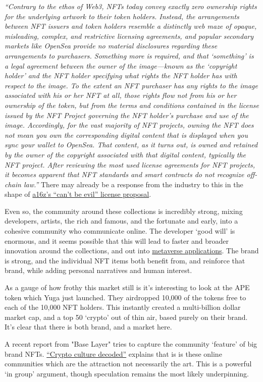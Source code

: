 \textit{``Contrary to the ethos of Web3, NFTs today convey exactly zero ownership rights for the underlying artwork to their token holders. Instead, the arrangements between NFT issuers and token holders resemble a distinctly web maze of opaque, misleading, complex, and restrictive licensing agreements, and popular secondary markets like OpenSea provide no material disclosures regarding these arrangements to purchasers. Something more is required, and that `something' is a legal agreement between the owner of the image—known as the `copyright holder' and the NFT holder specifying what rights the NFT holder has with respect to the image. To the extent an NFT purchaser has any rights to the image associated with his or her NFT at all, those rights flow not from his or her ownership of the token, but from the terms and conditions contained in the license issued by the NFT Project governing the NFT holder’s purchase and use of the image. Accordingly, for the vast majority of NFT projects, owning the NFT does not mean you own the corresponding digital content that is displayed when you sync your wallet to OpenSea. That content, as it turns out, is owned and retained by the owner of the copyright associated with that digital content, typically the NFT project.
After reviewing the most used license agreements for NFT projects, it becomes apparent that NFT standards and smart contracts do not recognize off-chain law.''} There may already be a response from the industry to this in the shape of \href{https://a16zcrypto.com/introducing-nft-licenses/}{a16z's ``can't be evil'' license proposal}.\par
Even so, the community around these collections is incredibly strong, mixing developers, artists, the rich and famous, and the fortunate and early, into a cohesive community who communicate online. The developer `good will' is enormous, and it seems possible that this will lead to faster and broader innovation around the collections, and out into \href{https://twitter.com/yugalabs/status/1505014986556551172?}{metaverse applications}. The brand is strong, and the individual NFT items both benefit from, and reinforce that brand, while adding personal narratives and human interest.\par 
As a gauge of how frothy this market still is it's interesting to look at the APE token which Yuga just launched. They airdropped 10,000 of the tokens free to each of the 10,000 NFT holders. This instantly created a multi-billion dollar market cap, and a top 50 `crypto' out of thin air, based purely on their brand. It's clear that there is both brand, and a market here.\par
A recent report from "Base Layer" tries to capture the community `feature' of big brand NFTs. \href{https://baselayer.so/crypto-culture-decoded}{``Crypto culture decoded''} explains that is is these online communities which are the attraction not necessarily the art. This is a powerful `in group' argument, though speculation remains the most likely underpinning.\par

